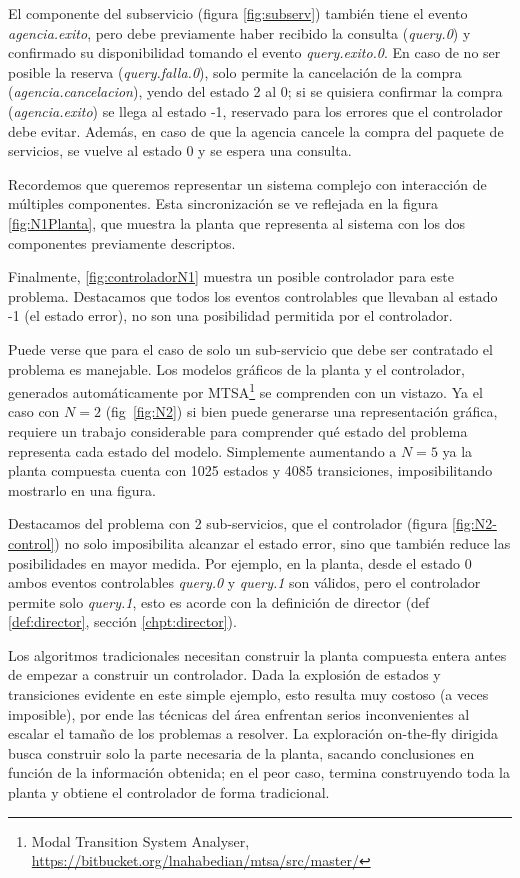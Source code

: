 El componente del subservicio (figura \ref{fig:subserv}) también tiene el evento \textit{agencia.exito}, pero debe previamente haber recibido la consulta (\textit{query.0}) y confirmado su disponibilidad tomando el evento \textit{query.exito.0}. En caso de no ser posible la reserva (\textit{query.falla.0}), solo permite la cancelación de la compra (\textit{agencia.cancelacion}), yendo del estado 2 al 0; si se quisiera confirmar la compra (\textit{agencia.exito}) se llega al estado -1, reservado para los errores que el controlador debe evitar. Además, en caso de que la agencia cancele la compra del paquete de servicios, se vuelve al estado 0 y se espera una consulta.

Recordemos que queremos representar un sistema complejo con interacción de múltiples componentes. Esta sincronización se ve reflejada en la figura \ref{fig:N1Planta}, que muestra la planta que representa al sistema con los dos componentes previamente descriptos. 

Finalmente, \ref{fig:controladorN1} muestra un posible controlador para este problema. Destacamos que todos los eventos controlables que llevaban al estado -1 (el estado error), no son una posibilidad permitida por el controlador. 

Puede verse que para el caso de solo un sub-servicio que debe ser contratado el problema es manejable. Los modelos gráficos de la planta y el controlador, generados automáticamente por MTSA\footnote{Modal Transition System Analyser, \href{https://bitbucket.org/lnahabedian/mtsa/src/master/^}{https://bitbucket.org/lnahabedian/mtsa/src/master/}} se comprenden con un vistazo. Ya el caso con $N=2$ (fig~\ref{fig:N2}) si bien puede generarse una representación gráfica, requiere un trabajo considerable para comprender qué estado del problema representa cada estado del modelo. Simplemente aumentando a $N=5$ ya la planta compuesta cuenta con 1025 estados y 4085 transiciones, imposibilitando mostrarlo en una figura. 

Destacamos del problema con 2 sub-servicios, que el controlador (figura \ref{fig:N2-control}) no solo imposibilita alcanzar el estado error, sino que también reduce las posibilidades en mayor medida. Por ejemplo, en la planta, desde el estado 0 ambos eventos controlables \textit{query.0} y \textit{query.1} son válidos, pero el controlador permite solo \textit{query.1}, esto es acorde con la definición de director (def \ref{def:director}, sección \ref{chpt:director}).

Los algoritmos tradicionales necesitan construir la planta compuesta entera antes de empezar a construir un controlador. Dada la explosión de estados y transiciones evidente en este simple ejemplo, esto resulta muy costoso (a veces imposible), por ende las técnicas del área enfrentan serios inconvenientes al escalar el tamaño de los problemas a resolver. La exploración on-the-fly dirigida busca construir solo la parte  necesaria de la planta, sacando conclusiones en función de la información obtenida; en el peor caso, termina construyendo toda la planta y obtiene el controlador de forma tradicional.








